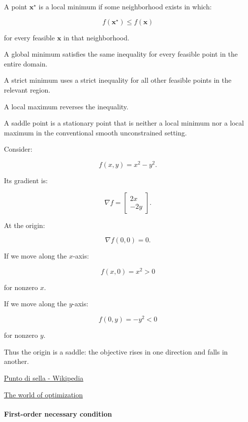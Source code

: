 A point \(\mathbf x^\star\) is a local minimum if some neighborhood exists in which:

\[
f(\mathbf x^\star)\le f(\mathbf x)
\]

for every feasible \(\mathbf x\) in that neighborhood.

A global minimum satisfies the same inequality for every feasible point in the entire domain.

A strict minimum uses a strict inequality for all other feasible points in the relevant region.

A local maximum reverses the inequality.

A saddle point is a stationary point that is neither a local minimum nor a local maximum in the conventional smooth unconstrained setting.

Consider:

\[
f(x,y)=x^2-y^2.
\]

Its gradient is:

\[
\nabla f= \begin{bmatrix} 2x\\-2y \end{bmatrix}.
\]

At the origin:

\[
\nabla f(0,0)=0.
\]

If we move along the \(x\)-axis:

\[
f(x,0)=x^2>0
\]

for nonzero \(x\).

If we move along the \(y\)-axis:

\[
f(0,y)=-y^2<0
\]

for nonzero \(y\).

Thus the origin is a saddle: the objective rises in one direction and falls in another.

\href{https://images.openai.com/static-rsc-4/IqMqjdabbXp9lgF1Y59BWcBJuurZz0BV9d1Mv_AppeNOVYVoRQPuuV61Cf6TJAGqRi-DqMXoElE3-r5maVwHTXuo83A0mjM4FaBadvF4zNjF2LeOOzMjujVpT69hboVYADw65CSdRZt7hW_eNVx2xfRet5TkDNIoAwZTLnVQSgY?purpose=inline}{Punto di sella - Wikipedia}

\href{https://images.openai.com/static-rsc-4/2hdI6qSb-Gmq24hva1IPzdMch7SbSaYVsYlCAepKmsA3SZDPddxqa6DCww0y-FyOpM9G78ABWGxf3MsZs07Pfn1BlWk34xJqOTG0ScUe2i3GJrc8HXVjsf5kBDzuZpsfQjpbPkJbrEk2b-r1gAKcleVv-hPxqzAz9Qwbl9J2BsI?purpose=inline}{The world of optimization}

\paragraph{First-order necessary condition}\label{02-foundations-ii-ch026-first-order-necessary-condition}

